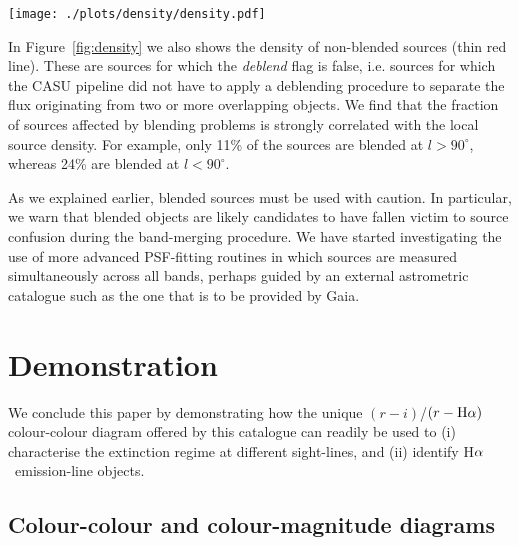\documentclass[useAMS,usenatbib]{mn2e}
\def\ha{\mbox{H$\rm \alpha$}}
\begin{document}
\begin{figure*}
    \texttt{[image: ./plots/density/density.pdf]} 
    \caption{Mean number density of sources in the catalogue 
    as a function of Galactic longitude, 
    with and without blended sources included. 
    The densities shown were computed by counting the sources 
    at each longitude between $-5^\circ<b<+5^\circ$ (upper blue line).
    We also show the densities based on only counting those sources 
    for which the \emph{deblend} flag is {\sc false}, 
    i.e. unconfused sources for which the CASU pipeline did not have to apply 
    a deblending procedure (lower red line). 
    }
    \label{fig:density}
\end{figure*}

In Figure~\ref{fig:density} we also shows the density
of non-blended sources (thin red line).
These are sources for which the \emph{deblend} flag is {\sc false},
i.e. sources for which the CASU pipeline did not have to apply 
a deblending procedure to separate the flux
originating from two or more overlapping objects.
We find that the fraction of sources affected by blending problems
is strongly correlated with the local source density.
For example, only 11\% of the sources are blended
at $l>90^\circ$, whereas 24\% are blended at $l<90^\circ$.

As we explained earlier, blended sources must be used with caution.
In particular, we warn that blended objects
are likely candidates to have fallen victim
to source confusion during the band-merging procedure.
We have started investigating the use of
more advanced PSF-fitting routines
in which sources are measured simultaneously across all bands,
perhaps guided by an external astrometric catalogue such as the one
that is to be provided by Gaia.

\section{Demonstration}
\label{sec:demonstration}

We conclude this paper by demonstrating how the unique
$(r-i)$/$(r-\ha)$ colour-colour diagram offered by this catalogue
can readily be used to
(i) characterise the extinction regime at different sight-lines, and
(ii) identify \ha\ emission-line objects.

\subsection{Colour-colour and colour-magnitude diagrams}
\end{document}
